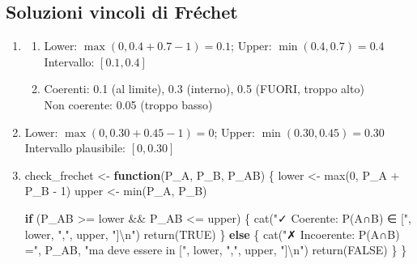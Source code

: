 \documentclass[
  italian,
  letterpaper,
  a4paper,
  11pt,
  open=any]{scrbook}
\newenvironment{Shaded}{\begin{snugshade}}{\end{snugshade}}
\newcommand{\ConstantTok}[1]{\textcolor[rgb]{0.56,0.35,0.01}{#1}}
\newcommand{\ControlFlowTok}[1]{\textcolor[rgb]{0.00,0.23,0.31}{\textbf{#1}}}
\newcommand{\DecValTok}[1]{\textcolor[rgb]{0.68,0.00,0.00}{#1}}
\newcommand{\FunctionTok}[1]{\textcolor[rgb]{0.28,0.35,0.67}{#1}}
\newcommand{\NormalTok}[1]{\textcolor[rgb]{0.00,0.23,0.31}{#1}}
\newcommand{\OtherTok}[1]{\textcolor[rgb]{0.00,0.23,0.31}{#1}}
\newcommand{\SpecialCharTok}[1]{\textcolor[rgb]{0.37,0.37,0.37}{#1}}
\newcommand{\StringTok}[1]{\textcolor[rgb]{0.13,0.47,0.30}{#1}}
\theoremstyle{plain}
\theoremstyle{definition}
\theoremstyle{definition}
\theoremstyle{remark}
\begin{document}
\begin{tcolorbox}
\subsection{Soluzioni vincoli di
Fréchet}\label{soluzioni-vincoli-di-fruxe9chet}

\begin{enumerate}
\def\labelenumi{\arabic{enumi}.}
\setcounter{enumi}{3}
\item
  \begin{enumerate}
  \def\labelenumii{\alph{enumii}.}
  \item
    Lower: \(\max(0, 0.4 + 0.7 - 1) = 0.1\); Upper:
    \(\min(0.4, 0.7) = 0.4\)\\
    Intervallo: \([0.1, 0.4]\)
  \item
    Coerenti: 0.1 (al limite), 0.3 (interno), 0.5 (FUORI, troppo alto)\\
    Non coerente: 0.05 (troppo basso)
  \end{enumerate}
\item
  Lower: \(\max(0, 0.30 + 0.45 - 1) = 0\); Upper:
  \(\min(0.30, 0.45) = 0.30\)\\
  Intervallo plausibile: \([0, 0.30]\)
\item
\begin{Shaded}
\begin{Highlighting}[]
\NormalTok{check\_frechet }\OtherTok{\textless{}{-}} \ControlFlowTok{function}\NormalTok{(P\_A, P\_B, P\_AB) \{}
\NormalTok{  lower }\OtherTok{\textless{}{-}} \FunctionTok{max}\NormalTok{(}\DecValTok{0}\NormalTok{, P\_A }\SpecialCharTok{+}\NormalTok{ P\_B }\SpecialCharTok{{-}} \DecValTok{1}\NormalTok{)}
\NormalTok{  upper }\OtherTok{\textless{}{-}} \FunctionTok{min}\NormalTok{(P\_A, P\_B)}

  \ControlFlowTok{if}\NormalTok{ (P\_AB }\SpecialCharTok{\textgreater{}=}\NormalTok{ lower }\SpecialCharTok{\&\&}\NormalTok{ P\_AB }\SpecialCharTok{\textless{}=}\NormalTok{ upper) \{}
    \FunctionTok{cat}\NormalTok{(}\StringTok{"✓ Coerente: P(A∩B) ∈ ["}\NormalTok{, lower, }\StringTok{","}\NormalTok{, upper, }\StringTok{"]}\SpecialCharTok{\textbackslash{}n}\StringTok{"}\NormalTok{)}
    \FunctionTok{return}\NormalTok{(}\ConstantTok{TRUE}\NormalTok{)}
\NormalTok{  \} }\ControlFlowTok{else}\NormalTok{ \{}
    \FunctionTok{cat}\NormalTok{(}\StringTok{"✗ Incoerente: P(A∩B) ="}\NormalTok{, P\_AB, }
        \StringTok{"ma deve essere in ["}\NormalTok{, lower, }\StringTok{","}\NormalTok{, upper, }\StringTok{"]}\SpecialCharTok{\textbackslash{}n}\StringTok{"}\NormalTok{)}
    \FunctionTok{return}\NormalTok{(}\ConstantTok{FALSE}\NormalTok{)}
\NormalTok{  \}}
\NormalTok{\}}
\end{Highlighting}
\end{Shaded}
\end{enumerate}


\end{tcolorbox}
\end{document}
